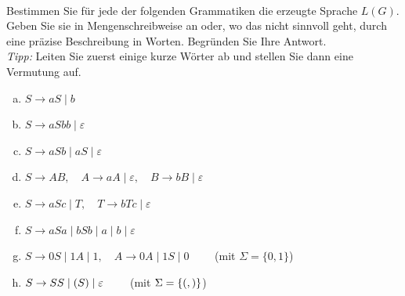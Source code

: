 \\
Bestimmen Sie für jede der folgenden Grammatiken die erzeugte Sprache $L(G)$. Geben Sie sie in Mengenschreibweise an oder, wo das nicht sinnvoll geht, durch eine präzise Beschreibung in Worten. Begründen Sie Ihre Antwort.\\
\emph{Tipp:} Leiten Sie zuerst einige kurze Wörter ab und stellen Sie dann eine Vermutung auf.
\begin{enumerate}[a)]
  \item $S\to aS\mid b$
  \item $S\to aSbb\mid\varepsilon$
  \item $S\to aSb\mid aS\mid\varepsilon$
  \item $S\to AB,\quad A\to aA\mid\varepsilon,\quad B\to bB\mid\varepsilon$
  \item $S\to aSc\mid T,\quad T\to bTc\mid\varepsilon$
  \item $S\to aSa\mid bSb\mid a\mid b\mid\varepsilon$
  \item $S\to 0S\mid 1A\mid 1,\quad A\to 0A\mid 1S\mid 0\qquad$ (mit $\Sigma=\{0,1\}$)
  \item $S\to SS\mid\mathtt{(}S\mathtt{)}\mid\varepsilon\qquad$ (mit $\Sigma=\{\mathtt{(},\mathtt{)}\}$)
\end{enumerate}

